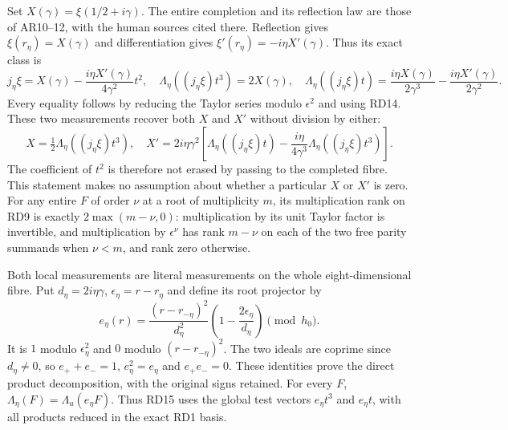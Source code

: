\documentclass[11pt]{article}
\begin{document}
Set $X(\gamma)=\xi(1/2+i\gamma)$. The entire completion
and its reflection law are those of AR10--12, with the
human sources cited there. Reflection gives
$\xi(r_\eta)=X(\gamma)$ and differentiation gives
$\xi'(r_\eta)=-i\eta X'(\gamma)$. Thus its exact class is
\begin{equation}
 j_\eta\xi=X(\gamma)-\frac{i\eta X'(\gamma)}{4\gamma^2}t^2,
 \quad
 \Lambda_\eta((j_\eta\xi)t^3)=2X(\gamma),\quad
 \Lambda_\eta((j_\eta\xi)t)=
 \frac{i\eta X(\gamma)}{2\gamma^3}
       -\frac{i\eta X'(\gamma)}{2\gamma^2}.
 \tag{RD15}
\end{equation}
Every equality follows by reducing the Taylor series modulo
$\epsilon^2$ and using RD14. These two measurements recover
both $X$ and $X'$ without division by either:
\begin{equation}
 X=\tfrac12\Lambda_\eta((j_\eta\xi)t^3),\quad
 X'=2i\eta\gamma^2\left[
 \Lambda_\eta((j_\eta\xi)t)
 -\frac{i\eta}{4\gamma^3}\Lambda_\eta((j_\eta\xi)t^3)
 \right].
 \tag{RD16}
\end{equation}
The coefficient of $t^2$ is therefore not erased by passing
to the completed fibre. This statement makes no assumption
about whether a particular $X$ or $X'$ is zero. For any
entire $F$ of order $\nu$ at a root of multiplicity $m$,
its multiplication rank on RD9 is exactly
$2\max(m-\nu,0)$: multiplication by its unit Taylor factor
is invertible, and multiplication by $\epsilon^\nu$ has
rank $m-\nu$ on each of the two free parity summands when
$\nu<m$, and rank zero otherwise.

Both local measurements are literal measurements on the
whole eight-dimensional fibre. Put $d_\eta=2i\eta\gamma$,
$\epsilon_\eta=r-r_\eta$ and define its root projector by
\begin{equation}
 e_\eta(r)=\frac{(r-r_{-\eta})^2}{d_\eta^2}
                \left(1-\frac{2\epsilon_\eta}{d_\eta}\right)
                  \pmod{h_0}.
 \tag{RD17}
\end{equation}
It is $1$ modulo $\epsilon_\eta^2$ and $0$ modulo
$(r-r_{-\eta})^2$. The two ideals are coprime since
$d_\eta\ne0$, so $e_++e_-=1$, $e_\eta^2=e_\eta$ and
$e_+e_-=0$. These identities prove the direct product
decomposition, with the original signs retained.
For every $F$, $\Lambda_\eta(F)=\Lambda_u(e_\eta F)$.
Thus RD15 uses the global test vectors $e_\eta t^3$ and
$e_\eta t$, with all products reduced in the exact RD1 basis.
\end{document}
